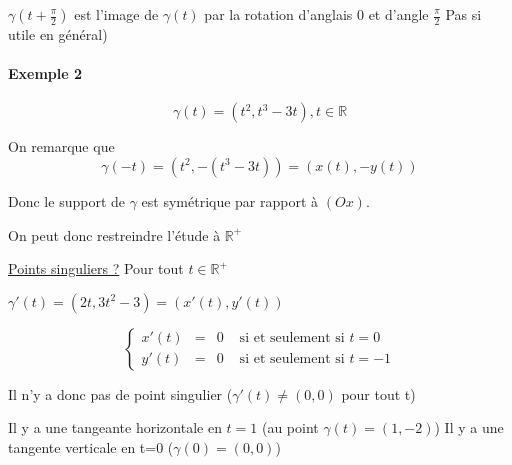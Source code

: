 		$\gamma(t + \frac{\pi}{2})$ est l'image de $\gamma(t)$ par la rotation d'anglais 0 et d'angle $\frac{\pi}{2}$ Pas si utile en général)

		\paragraph{Exemple 2} \[\gamma(t) = (t^2, t^3 - 3t), t \in \mathbb{R}\]

		On remarque que \[\gamma(-t) = (t^2, -(t^3 - 3t)) = (x(t), -y(t))\]

		Donc le support de $\gamma$ est symétrique par rapport à $(Ox)$.

		On peut donc restreindre l'étude à $\mathbb{R}^+$

		\ul{Points singuliers ?} Pour tout $t \in \mathbb{R}^+$

		$\gamma'(t) = (2t, 3t^2 - 3) = (x'(t), y'(t))$

		\[\left\{\begin{array}{rclr}
					x'(t) &=& 0 & \text{ si et seulement si } t = 0 \\
					y'(t) &=& 0 & \text{ si et seulement si } t = -1
			\end{array}\right.\]

			Il n'y a donc pas de point singulier ($\gamma'(t) \neq (0, 0)$ pour tout t)

			Il y a une tangeante horizontale en $t=1$ (au point $\gamma(t) = (1, -2)$)
			Il y a une tangente verticale en t=0 ($\gamma(0) = (0, 0)$)




